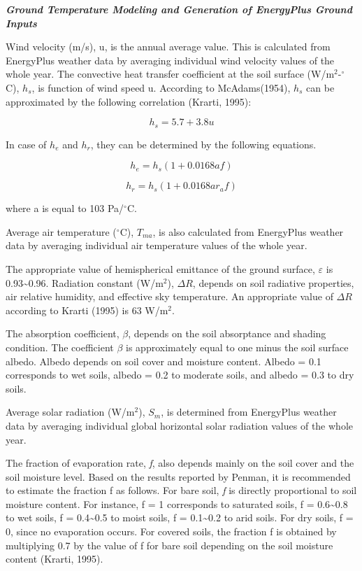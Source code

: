 \emph{\textbf{Ground Temperature Modeling and Generation of EnergyPlus Ground Inputs}}

Wind velocity (m/s), u, is the annual average value. This is calculated from EnergyPlus weather data by averaging individual wind velocity values of the whole year. The convective heat transfer coefficient at the soil surface (W/m\(^{2}\)-\(^{\circ}\)C), \(h_{s}\), is function of wind speed u. According to McAdams(1954), \(h_{s}\) can be approximated by the following correlation (Krarti, 1995):

\begin{equation}
{h_s} = 5.7 + 3.8u
\end{equation}

In case of \(h_{e}\) and \(h_{r}\), they can be determined by the following equations.

\begin{equation}
{h_e} = {h_s}\left( {1 + 0.0168af} \right)
\end{equation}

\begin{equation}
{h_r} = {h_s}\left( {1 + 0.0168a{r_a}f} \right)
\end{equation}

where a is equal to 103 Pa/\(^{\circ}\)C.

Average air temperature (\(^{\circ}\)C), \(T_{ma}\), is also calculated from EnergyPlus weather data by averaging individual air temperature values of the whole year.

The appropriate value of hemispherical emittance of the ground surface, \({\varepsilon}\) is 0.93\textasciitilde{}0.96. Radiation constant (W/m\(^{2}\)), \({\Delta R}\), depends on soil radiative properties, air relative humidity, and effective sky temperature. An appropriate value of \({\Delta R}\) according to Krarti (1995) is 63 W/m\(^{2}\).

The absorption coefficient, \({\beta}\), depends on the soil absorptance and shading condition. The coefficient \({\beta}\) is approximately equal to one minus the soil surface albedo. Albedo depends on soil cover and moisture content. Albedo = 0.1 corresponds to wet soils, albedo = 0.2 to moderate soils, and albedo = 0.3 to dry soils.

Average solar radiation (W/m\(^{2}\)), \(S_{m}\), is determined from EnergyPlus weather data by averaging individual global horizontal solar radiation values of the whole year.

The fraction of evaporation rate, \emph{f}, also depends mainly on the soil cover and the soil moisture level. Based on the results reported by Penman, it is recommended to estimate the fraction f as follows. For bare soil, \emph{f} is directly proportional to soil moisture content. For instance, f = 1 corresponds to saturated soils, f = 0.6\textasciitilde{}0.8 to wet soils, f = 0.4\textasciitilde{}0.5 to moist soils, f = 0.1\textasciitilde{}0.2 to arid soils. For dry soils, f = 0, since no evaporation occurs. For covered soils, the fraction f is obtained by multiplying 0.7 by the value of f for bare soil depending on the soil moisture content (Krarti, 1995).

